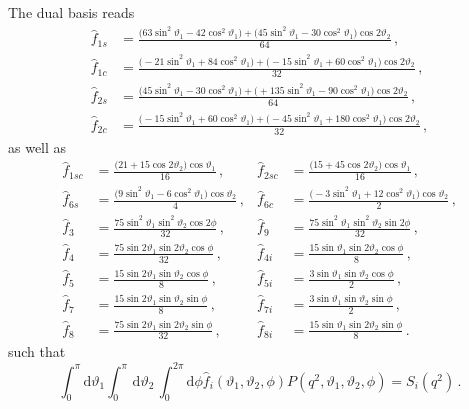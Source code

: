 \documentclass[aps,prd,reprint,nofootinbib,preprintnumbers]{revtex4}
\newcommand{\dd}{\text{d}}
\renewcommand{\theta}{\vartheta}
\begin{document}
The dual basis reads
\begin{equation}
\begin{aligned}
    \hat{f}_{1s} & = \frac{\big( 63 \sin^2\theta_1 - 42 \cos^2\theta_1\big) + \big(  45 \sin^2\theta_1 - 30 \cos^2\theta_1\big)\cos 2\theta_2}{64} \,,\\
    \hat{f}_{1c} & = \frac{\big(-21 \sin^2\theta_1 + 84 \cos^2\theta_1\big) + \big( -15 \sin^2\theta_1 + 60 \cos^2\theta_1\big)\cos 2\theta_2}{32} \,,\\
    \hat{f}_{2s} & = \frac{\big( 45 \sin^2\theta_1 - 30 \cos^2\theta_1\big) + \big(+135 \sin^2\theta_1 - 90 \cos^2\theta_1\big)\cos 2\theta_2}{64} \,,\\
    \hat{f}_{2c} & = \frac{\big(-15 \sin^2\theta_1 + 60 \cos^2\theta_1\big) + \big( -45 \sin^2\theta_1 +180 \cos^2\theta_1\big)\cos 2\theta_2}{32} \,,
\end{aligned}
\end{equation}
as well as
\begin{equation}
\begin{aligned}
    \hat{f}_{1sc}& = \frac{\big(21 + 15 \cos2\theta_2\big)\cos\theta_1}{16}               \,,&
    \hat{f}_{2sc}& = \frac{\big(15 + 45 \cos2\theta_2\big)\cos\theta_1}{16}               \,,\\
    \hat{f}_{6s} & = \frac{\big( 9\sin^2\theta_1 -  6 \cos^2\theta_1\big)\cos\theta_2}{4} \,,&
    \hat{f}_{6c} & = \frac{\big(-3\sin^2\theta_1 + 12 \cos^2\theta_1\big)\cos\theta_2}{2} \,,\\
    \hat{f}_{3}  & = \frac{75 \sin^2\theta_1 \sin^2\theta_2 \cos2\phi}{32}                \,,&
    \hat{f}_{9}  & = \frac{75 \sin^2\theta_1 \sin^2\theta_2 \sin2\phi}{32}                \,,\\
    \hat{f}_{4}  & = \frac{75 \sin 2\theta_1 \sin 2\theta_2 \cos \phi}{32}                \,,&
    \hat{f}_{4i} & = \frac{15 \sin  \theta_1 \sin 2\theta_2 \cos \phi}{8}                 \,,\\
    \hat{f}_{5}  & = \frac{15 \sin 2\theta_1 \sin  \theta_2 \cos \phi}{8}                 \,,&
    \hat{f}_{5i} & = \frac{3  \sin  \theta_1 \sin  \theta_2 \cos \phi}{2}                 \,,\\
    \hat{f}_{7}  & = \frac{15 \sin 2\theta_1 \sin  \theta_2 \sin \phi}{8}                 \,,&
    \hat{f}_{7i} & = \frac{3  \sin  \theta_1 \sin  \theta_2 \sin \phi}{2}                 \,,\\
    \hat{f}_{8}  & = \frac{75 \sin 2\theta_1 \sin 2\theta_2 \sin \phi}{32}                \,,&
    \hat{f}_{8i} & = \frac{15 \sin  \theta_1 \sin 2\theta_2 \sin \phi}{8}                 \,.
\end{aligned}
\end{equation}
such that 
\begin{equation}
    \int_0^\pi \dd\theta_1 \int_0^\pi\,\dd\theta_2\, \int_0^{2\pi}\dd \phi \hat{f}_i(\theta_1,\theta_2,\phi) P(q^2, \theta_1,\theta_2,\phi) = S_i(q^2)\,.
\end{equation}
\end{document}
